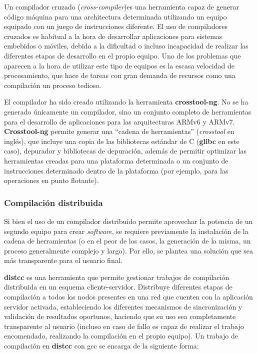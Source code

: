 Un compilador cruzado (\textit{cross-compiler})es una herramienta capaz de generar código máquina para una architectura determinada utilizando un equipo equipado con un juego de instrucciones diferente.%
El uso de compiladores cruzados es habitual a la hora de desarrollar aplicaciones para sistemas embebidos o móviles, debido a la dificultad o incluso incapacidad de realizar las diferentes etapas de desarrollo en el propio equipo. Uno de los problemas que aparecen a la hora de utilizar este tipo de equipos es la escasa velocidad de procesamiento, que hace de tareas con gran demanda de recursos como una compilación un proceso tedioso.

El compilador ha sido creado utilizando la herramienta \textbf{crosstool-ng}. No se ha generado únicamente un compilador, sino un conjunto completo de herramientas para el desarrollo de aplicaciones para las arquitecturas ARMv6 y ARMv7. \textbf{Crosstool-ng} permite generar una ``cadena de herramientas'' (\textit{crosstool} en inglés), que incluye una copia de las bibliotecas estándar de C (\textbf{glibc} en este caso), depurador y bibliotecas de depuración, además de permitir optimizar las herramientas creadas para una plataforma determinada o un conjunto de instrucciones determinado dentro de la plataforma (por ejemplo, para las operaciones en punto flotante).

\subsubsection{Compilación distribuida}

Si bien el uso de un compilador distribuido permite aprovechar la potencia de un segundo equipo para crear \textit{software}, se requiere previamente la instalación de la cadena de herramientas (o en el peor de los casos, la generación de la misma, un proceso generalmente complejo y largo). Por ello, se plantea una solución que sea más transparente para el usuario final.

\textbf{distcc} es una herramienta que permite gestionar trabajos de compilación distribuida en un esquema cliente-servidor. Distribuye diferentes etapas de compilación a todos los nodos presentes en una red que cuenten con la aplicación servidor activada, estableciendo los diferentes mecanismos de sincronización y validación de resultados oportunos, haciendo que su uso sea completamente transparente al usuario (incluso en caso de fallo es capaz de realizar el trabajo encomendado, realizando la compilación en el propio equipo). Un trabajo de compilación en \textbf{distcc} con gcc se encarga de la siguiente forma:

